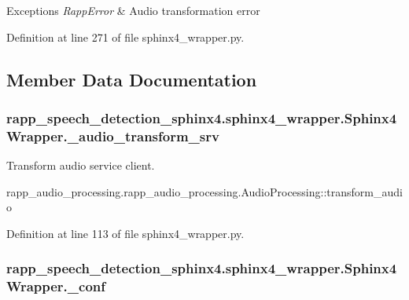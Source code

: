 \begin{DoxyExceptions}{Exceptions}
{\em Rapp\-Error} & Audio transformation error \\
\hline
\end{DoxyExceptions}


Definition at line 271 of file sphinx4\-\_\-wrapper.\-py.



\subsection{Member Data Documentation}
\hypertarget{classrapp__speech__detection__sphinx4_1_1sphinx4__wrapper_1_1Sphinx4Wrapper_adb28d10db0b145ae5607eefbfa07edd3}{
\subsubsection[{\-\_\-audio\-\_\-transform\-\_\-srv}]{\setlength{\rightskip}{0pt plus 5cm}rapp\-\_\-speech\-\_\-detection\-\_\-sphinx4.\-sphinx4\-\_\-wrapper.\-Sphinx4\-Wrapper.\-\_\-audio\-\_\-transform\-\_\-srv\hspace{0.3cm}{\ttfamily [private]}}}\label{classrapp__speech__detection__sphinx4_1_1sphinx4__wrapper_1_1Sphinx4Wrapper_adb28d10db0b145ae5607eefbfa07edd3}


Transform audio service client. 

rapp\-\_\-audio\-\_\-processing.\-rapp\-\_\-audio\-\_\-processing.\-Audio\-Processing\-::transform\-\_\-audio 

Definition at line 113 of file sphinx4\-\_\-wrapper.\-py.

\hypertarget{classrapp__speech__detection__sphinx4_1_1sphinx4__wrapper_1_1Sphinx4Wrapper_a8b61ba8ea3e28ea8cb2317d1a83a2730}{
\subsubsection[{\-\_\-conf}]{\setlength{\rightskip}{0pt plus 5cm}rapp\-\_\-speech\-\_\-detection\-\_\-sphinx4.\-sphinx4\-\_\-wrapper.\-Sphinx4\-Wrapper.\-\_\-conf\hspace{0.3cm}{\ttfamily [private]}}}\label{classrapp__speech__detection__sphinx4_1_1sphinx4__wrapper_1_1Sphinx4Wrapper_a8b61ba8ea3e28ea8cb2317d1a83a2730}


